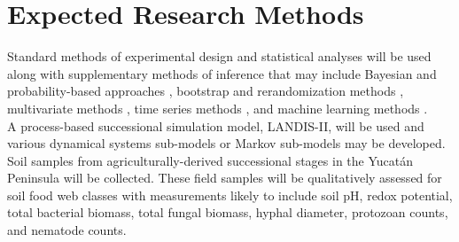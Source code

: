 \documentclass[twoside]{article}	%
\begin{document}
\section{Expected Research Methods}
Standard methods of experimental design \citep{montgomery_design_2013} and statistical analyses \citep{R_computing} will be used along with supplementary methods of inference that may include Bayesian and probability-based approaches \citep{hoff_first_2009, lunn_bugs_2013, jaynes_probability_2003}, bootstrap and rerandomization methods \citep {lunneborg_data_2000}, multivariate methods \citep{johnson_applied_2007}, time series methods \citep{shumway_time_2011}, and machine learning methods \citep{alpaydin_introduction_2014}.\\

A process-based successional simulation model, LANDIS-II, will be used \citep{scheller_design_2007} and various dynamical systems sub-models \citep{haefner_modeling_2005} or Markov sub-models \citep{fink_markov_2014} may be developed.\\

Soil samples from agriculturally-derived successional stages in the Yucat\'{a}n Peninsula will be collected. These field samples will be qualitatively assessed for soil food web classes with measurements likely to include soil pH, redox potential, total bacterial biomass, total fungal biomass, hyphal diameter, protozoan counts, and nematode counts.




\newpage


\end{document}
